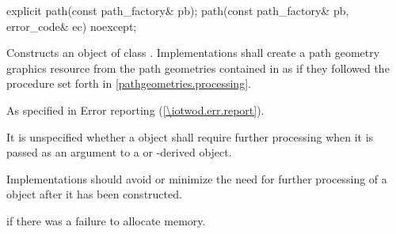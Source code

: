 \begin{itemdecl}
    explicit path(const path_factory& pb);
    path(const path_factory& pb, error_code& ec) noexcept;
\end{itemdecl}
\begin{itemdescr}
	\pnum
	\effects
	Constructs an object of class . Implementations shall create a path geometry graphics resource from the path geometries contained in  as if they followed the procedure set forth in \ref{pathgeometries.processing}.

	\pnum
	\throws
	As specified in Error reporting (\ref{\iotwod.err.report}).

	\pnum
	\remarks
	It is unspecified whether a  object shall require further processing when it is passed as an argument to a  or -derived object.
	
	\pnum
	Implementations should avoid or minimize the need for further processing of a  object after it has been constructed.

	\pnum
	\errors
	 if there was a failure to allocate memory.
	
%	
	
\end{itemdescr}
